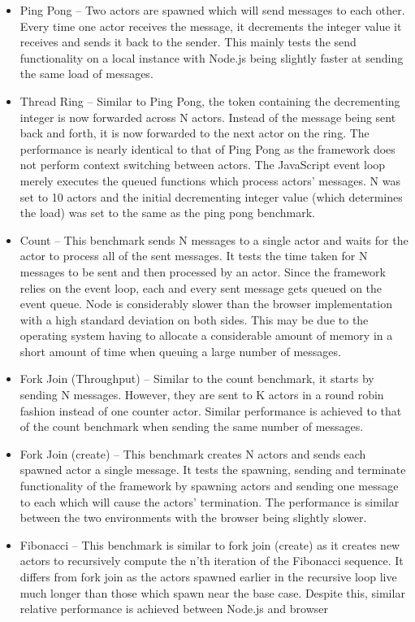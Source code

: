 \documentclass[12pt, a4paper]{report}
\theoremstyle{definition}
\theoremstyle{definition}%
\theoremstyle{definition}%
\theoremstyle{definition}%
\theoremstyle{definition}%
\theoremstyle{definition}%
\begin{document}
\begin{itemize}
    \item Ping Pong – Two actors are spawned which will send messages to each other. Every time one actor receives the message, it decrements the integer value it receives and sends it back to the sender. This mainly tests the send functionality on a local instance with Node.js being slightly faster at sending the same load of messages.
    \item Thread Ring – Similar to Ping Pong, the token containing the decrementing integer is now forwarded across N actors. Instead of the message being sent back and forth, it is now forwarded to the next actor on the ring. The performance is nearly identical to that of Ping Pong as the framework does not perform context switching between actors. The JavaScript event loop merely executes the queued functions which process actors' messages. N was set to 10 actors and the initial decrementing integer value (which determines the load) was set to the same as the ping pong benchmark.
    \item Count – This benchmark sends N messages to a single actor and waits for the actor to process all of the sent messages. It tests the time taken for N messages to be sent and then processed by an actor. Since the framework relies on the event loop, each and every sent message gets queued on the event queue. Node is considerably slower than the browser implementation with a high standard deviation on both sides. This may be due to the operating system having to allocate a considerable amount of memory in a short amount of time when queuing a large number of messages.
    \item Fork Join (Throughput) – Similar to the count benchmark, it starts by sending N messages. However, they are sent to K actors in a round robin fashion instead of one counter actor. Similar performance is achieved to that of the count benchmark when sending the same number of messages.
    \item Fork Join (create) – This benchmark creates N actors and sends each spawned actor a single message. It tests the spawning, sending and terminate functionality of the framework by spawning actors and sending one message to each which will cause the actors' termination. The performance is similar between the two environments with the browser being slightly slower.
    \item Fibonacci – This benchmark is similar to fork join (create) as it creates new actors to recursively compute the n'th iteration of the Fibonacci sequence. It differs from fork join as the actors spawned earlier in the recursive loop live much longer than those which spawn near the base case. Despite this, similar relative performance is achieved between Node.js and browser

\end{itemize}
\end{document}
